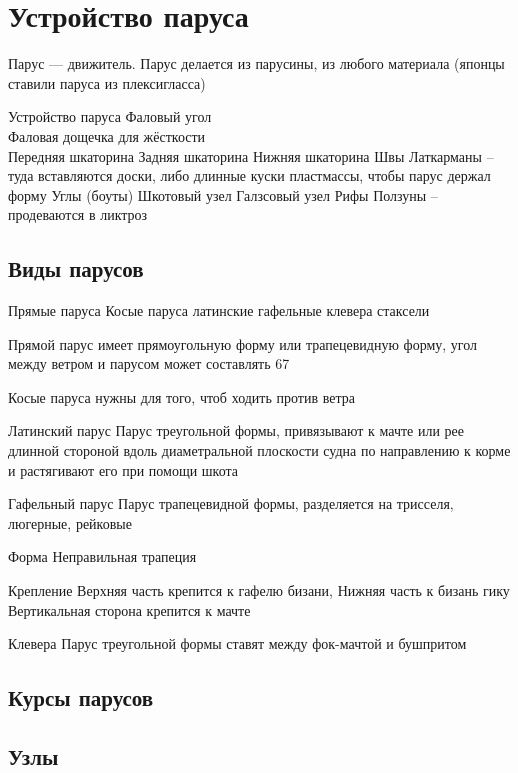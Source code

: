 \documentclass{article}        %
\begin{document}




\section{Устройство паруса}          
Парус --- движитель. Парус делается из парусины, из любого материала (японцы ставили паруса из плексигласса)

Устройство паруса
	Фаловый угол \\
	Фаловая дощечка для жёсткости \\
	Передняя шкаторина
	Задняя шкаторина
	Нижняя шкаторина
	Швы
	Латкарманы -- туда вставляются доски, либо длинные куски пластмассы, чтобы парус держал форму
	Углы (боуты)
	Шкотовый узел
	Галзсовый узел
	Рифы
	Ползуны -- продеваются в ликтроз

\subsection{Виды парусов}
Прямые паруса
Косые паруса
	латинские
	гафельные
	клевера
	стаксели

Прямой парус имеет прямоугольную форму или трапецевидную форму, угол между ветром и парусом может составлять 67\deg

Косые паруса нужны для того, чтоб ходить против ветра

Латинский парус
Парус треугольной формы, привязывают к мачте или рее длинной стороной вдоль диаметральной плоскости судна по направлению к корме и растягивают его при помощи шкота

Гафельный парус
Парус трапецевидной формы, разделяется на трисселя, люгерные, рейковые

Форма
Неправильная трапеция

Крепление
Верхняя часть крепится к гафелю бизани, 
Нижняя часть к бизань гику
Вертикальная сторона крепится к мачте

Клевера
Парус треугольной формы ставят между фок-мачтой и бушпритом

\subsection{Курсы парусов}

\subsection{Узлы}
\end{document}
